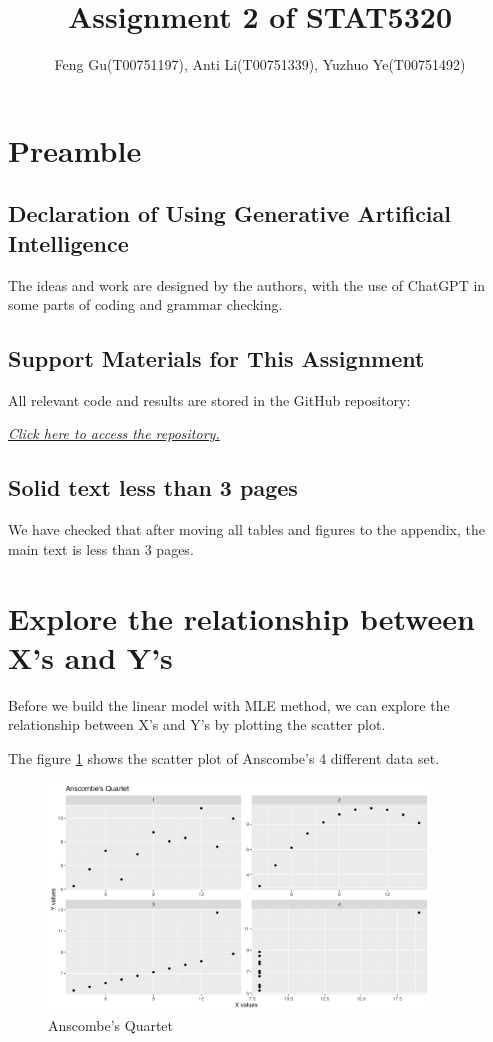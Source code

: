 \documentclass[12pt]{article}
\title{
Assignment 2 of STAT5320
}
\author{Feng Gu(T00751197), Anti Li(T00751339), Yuzhuo Ye(T00751492)}
\begin{document}
\maketitle

\section{Preamble}
\subsection{Declaration of Using Generative Artificial Intelligence}
The ideas and work are designed by the authors, with the use of ChatGPT in some parts of coding and grammar checking.

\subsection{Support Materials for This Assignment}
All relevant code and results are stored in the GitHub repository:

\href{https://github.com/Gufeng-2002/5320_assignment_2.git}
{\textit{Click here to access the repository.}}

\subsection{Solid text less than 3 pages}
We have checked that after moving all tables and figures to the appendix, the main text is less than 3 pages.


\section{Explore the relationship between X's and Y's}

Before we build the linear model with MLE method, we can explore the relationship
between X's and Y's by plotting the scatter plot.

The figure \ref{fig:anscombe_quartet} shows the scatter plot of Anscombe's 4 different 
data set.

\begin{figure}[!h]
    \centering
    \includegraphics[width=0.9\textwidth]{../results/anscombe_quartet.png}
    \caption{Anscombe's Quartet}
    \label{fig:anscombe_quartet}
\end{figure}
\end{document}
